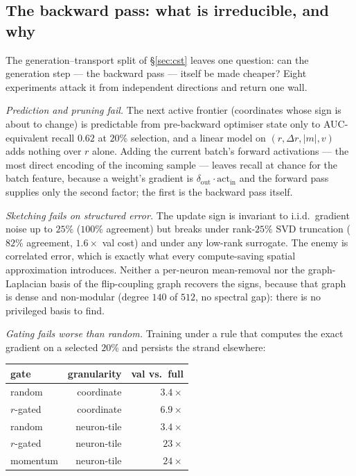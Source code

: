 \subsection{The backward pass: what is irreducible, and why}
\label{sec:backward}

The generation--transport split of \S\ref{sec:cst} leaves one question: can the
generation step --- the backward pass --- itself be made cheaper? Eight
experiments attack it from independent directions and return one wall.

\emph{Prediction and pruning fail.} The next active frontier (coordinates whose
sign is about to change) is predictable from pre-backward optimiser state only
to AUC-equivalent recall $0.62$ at $20\%$ selection, and a linear model on
$(r,\Delta r,|m|,v)$ adds nothing over $r$ alone. Adding the current batch's
forward activations --- the most direct encoding of the incoming sample ---
leaves recall at chance for the batch feature, because a weight's gradient is
$\delta_{\text{out}}\!\cdot\!\text{act}_{\text{in}}$ and the forward pass
supplies only the second factor; the first is the backward pass itself.

\emph{Sketching fails on structured error.} The update sign is invariant to
i.i.d.\ gradient noise up to $25\%$ ($100\%$ agreement) but breaks under
rank-$25\%$ SVD truncation ($82\%$ agreement, $1.6\times$ val cost) and under any
low-rank surrogate. The enemy is correlated error, which is exactly what every
compute-saving spatial approximation introduces. Neither a per-neuron
mean-removal nor the graph-Laplacian basis of the flip-coupling graph recovers
the signs, because that graph is dense and non-modular (degree $140$ of $512$,
no spectral gap): there is no privileged basis to find.

\emph{Gating fails worse than random.} Training under a rule that computes the
exact gradient on a selected $20\%$ and persists the strand elsewhere:

\begin{center}
\begin{tabular}{lrr}
\toprule
gate & granularity & val vs.\ full \\
\midrule
random    & coordinate & $3.4\times$ \\
$r$-gated & coordinate & $6.9\times$ \\
random    & neuron-tile & $3.4\times$ \\
$r$-gated & neuron-tile & $23\times$ \\
momentum  & neuron-tile & $24\times$ \\
\bottomrule
\end{tabular}
\end{center}

